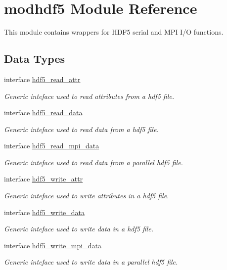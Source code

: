 \hypertarget{namespacemodhdf5}{}\section{modhdf5 Module Reference}
\label{namespacemodhdf5}


This module contains wrappers for H\+D\+F5 serial and M\+PI I/O functions.  


\subsection*{Data Types}
\begin{DoxyCompactItemize}
\item 
interface \hyperlink{interfacemodhdf5_1_1hdf5__read__attr}{hdf5\+\_\+read\+\_\+attr}
\begin{DoxyCompactList}\small\item\em Generic inteface used to read attributes from a hdf5 file. \end{DoxyCompactList}\item 
interface \hyperlink{interfacemodhdf5_1_1hdf5__read__data}{hdf5\+\_\+read\+\_\+data}
\begin{DoxyCompactList}\small\item\em Generic inteface used to read data from a hdf5 file. \end{DoxyCompactList}\item 
interface \hyperlink{interfacemodhdf5_1_1hdf5__read__mpi__data}{hdf5\+\_\+read\+\_\+mpi\+\_\+data}
\begin{DoxyCompactList}\small\item\em Generic inteface used to read data from a parallel hdf5 file. \end{DoxyCompactList}\item 
interface \hyperlink{interfacemodhdf5_1_1hdf5__write__attr}{hdf5\+\_\+write\+\_\+attr}
\begin{DoxyCompactList}\small\item\em Generic inteface used to write attributes in a hdf5 file. \end{DoxyCompactList}\item 
interface \hyperlink{interfacemodhdf5_1_1hdf5__write__data}{hdf5\+\_\+write\+\_\+data}
\begin{DoxyCompactList}\small\item\em Generic inteface used to write data in a hdf5 file. \end{DoxyCompactList}\item 
interface \hyperlink{interfacemodhdf5_1_1hdf5__write__mpi__data}{hdf5\+\_\+write\+\_\+mpi\+\_\+data}
\begin{DoxyCompactList}\small\item\em Generic inteface used to write data in a parallel hdf5 file. \end{DoxyCompactList}\end{DoxyCompactItemize}
